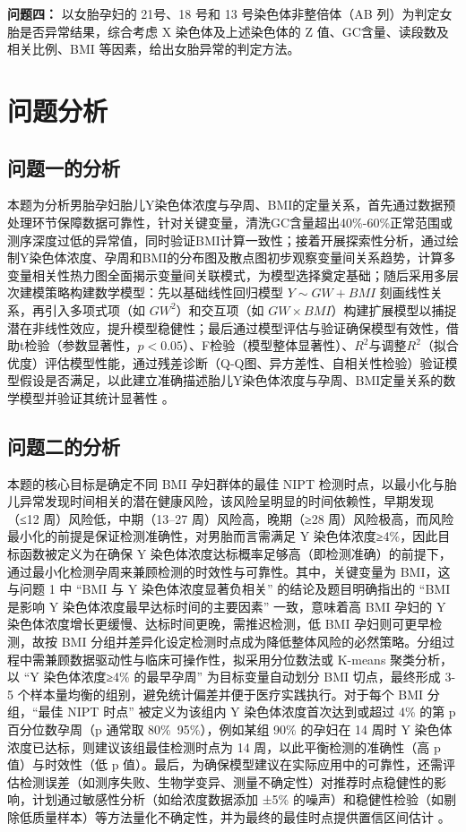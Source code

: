 \documentclass[withoutpreface,bwprint]{cumcmthesis} %
\begin{document}
\textbf{问题四：}
以女胎孕妇的 21号、18 号和 13 号染色体非整倍体（AB 列）为判定女胎是否异常结果，综合考虑 X 染色体及上述染色体的 Z 值、GC含量、读段数及相关比例、BMI 等因素，给出女胎异常的判定方法。


\section{问题分析}
\subsection{问题一的分析}

本题为分析男胎孕妇胎儿Y染色体浓度与孕周、BMI的定量关系，首先通过数据预处理环节保障数据可靠性，针对关键变量，清洗GC含量超出40\%-60\%正常范围或测序深度过低的异常值，同时验证BMI计算一致性；接着开展探索性分析，通过绘制Y染色体浓度、孕周和BMI的分布图及散点图初步观察变量间关系趋势，计算多变量相关性热力图全面揭示变量间关联模式，为模型选择奠定基础；随后采用多层次建模策略构建数学模型：先以基础线性回归模型 $Y \sim GW + BMI$ 刻画线性关系，再引入多项式项（如 $GW^2$）和交互项（如 $GW \times BMI$）构建扩展模型以捕捉潜在非线性效应，提升模型稳健性；最后通过模型评估与验证确保模型有效性，借助t检验（参数显著性，$p<0.05$）、F检验（模型整体显著性）、$R^2$与调整$R^2$（拟合优度）评估模型性能，通过残差诊断（Q-Q图、异方差性、自相关性检验）验证模型假设是否满足，以此建立准确描述胎儿Y染色体浓度与孕周、BMI定量关系的数学模型并验证其统计显著性 。

\subsection{问题二的分析}

本题的核心目标是确定不同 BMI 孕妇群体的最佳 NIPT 检测时点，以最小化与胎儿异常发现时间相关的潜在健康风险，该风险呈明显的时间依赖性，早期发现（≤12 周）风险低，中期（13–27 周）风险高，晚期（≥28 周）风险极高，而风险最小化的前提是保证检测准确性，对男胎而言需满足 Y 染色体浓度≥4\%，因此目标函数被定义为在确保 Y 染色体浓度达标概率足够高（即检测准确）的前提下，通过最小化检测孕周来兼顾检测的时效性与可靠性。其中，关键变量为 BMI，这与问题 1 中 “BMI 与 Y 染色体浓度显著负相关” 的结论及题目明确指出的 “BMI 是影响 Y 染色体浓度最早达标时间的主要因素” 一致，意味着高 BMI 孕妇的 Y 染色体浓度增长更缓慢、达标时间更晚，需推迟检测，低 BMI 孕妇则可更早检测，故按 BMI 分组并差异化设定检测时点成为降低整体风险的必然策略。分组过程中需兼顾数据驱动性与临床可操作性，拟采用分位数法或 K-means 聚类分析，以 “Y 染色体浓度≥4\% 的最早孕周” 为目标变量自动划分 BMI 切点，最终形成 3-5 个样本量均衡的组别，避免统计偏差并便于医疗实践执行。对于每个 BMI 分组，“最佳 NIPT 时点” 被定义为该组内 Y 染色体浓度首次达到或超过 4\% 的第 p 百分位数孕周（p 通常取 80\%~95\%），例如某组 90\% 的孕妇在 14 周时 Y 染色体浓度已达标，则建议该组最佳检测时点为 14 周，以此平衡检测的准确性（高 p 值）与时效性（低 p 值）。最后，为确保模型建议在实际应用中的可靠性，还需评估检测误差（如测序失败、生物学变异、测量不确定性）对推荐时点稳健性的影响，计划通过敏感性分析（如给浓度数据添加 ±5\% 的噪声）和稳健性检验（如剔除低质量样本）等方法量化不确定性，并为最终的最佳时点提供置信区间估计 。
\end{document}
